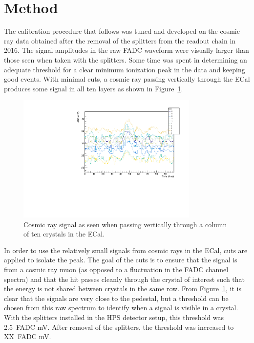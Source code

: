 \documentclass[twoside]{article}
\begin{document}
\section{Method}
The calibration procedure that follows was tuned and developed on the cosmic ray data obtained after the removal of the splitters from the readout chain in 2016. The signal amplitudes in the raw FADC waveform were visually larger than those seen when taken with the splitters. Some time was spent in determining an adequate threshold for a clear minimum ionization peak in the data and keeping good events. With minimal cuts, a cosmic ray passing vertically through the ECal produces some signal in all ten layers as shown in Figure~\ref{rawColumn}.\\
\begin{figure}[htb]
  \centering
      \includegraphics[width=0.8\textwidth]{pics/rayPassingVertically.pdf}
  \caption{Cosmic ray signal as seen when passing vertically through a column of ten crystals in the ECal.}
  \label{rawColumn}
\end{figure}	
In order to use the relatively small signals from cosmic rays in the ECal, cuts are applied to isolate the peak. The goal of the cuts is to ensure that the signal is from a cosmic ray muon (as opposed to a fluctuation in the FADC channel spectra) and that the hit passes cleanly through the crystal of interest such that the energy is not shared between crystals in the same row. From Figure~\ref{rawColumn}, it is clear that the signals are very close to the pedestal, but a threshold can be chosen from this raw spectrum to identify when a signal is visible in a crystal. With the splitters installed in the HPS detector setup, this threshold was 2.5~FADC mV. After removal of the splitters, the threshold was increased to XX~FADC mV. \\
\end{document}
